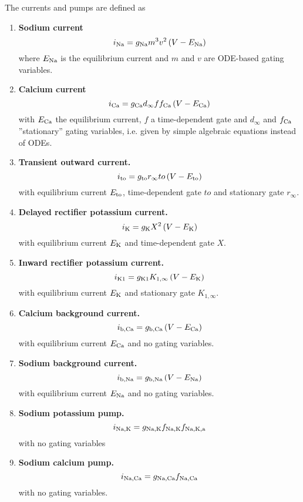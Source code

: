 \documentclass{scrartcl}
\begin{document}
The currents and pumps are defined as
\begin{enumerate}
\item {\bf Sodium current}
\begin{equation}
	i_{\rm Na} = g_{\rm Na} m^3 v^2 \left( V - E_{\rm Na} \right)
\end{equation}
where $E_{\rm Na}$ is the equilibrium current and $m$ and $v$ are ODE-based gating variables.
\item {\bf Calcium current}
\begin{equation}
	i_{\rm Ca} = g_{\rm Ca} d_{\infty} f f_{\rm Ca} \left( V - E_{\rm Ca} \right)
\end{equation}
with $E_{\rm Ca}$ the equilibrium current, $f$ a time-dependent gate and  $d_{\infty}$ and $f_{\rm Ca}$ ''stationary'' gating variables, i.e. given by simple algebraic equations instead of ODEs.
\item {\bf Transient outward current.}
\begin{equation}
	i_{\rm to} = g_{\rm to} r_{\infty} to \left( V - E_{\rm to} \right)
\end{equation}
with equilibrium current $E_{\rm to}$, time-dependent gate $to$ and stationary gate $r_{\infty}$.
\item {\bf Delayed rectifier potassium current.}
\begin{equation}
	i_{\rm K} = g_{\rm K} X^2 \left( V - E_{\rm K} \right)
\end{equation}
with equilibrium current $E_{\rm K}$ and time-dependent gate $X$.
\item {\bf Inward rectifier potassium current.}
\begin{equation}
	i_{\rm K1} = g_{\rm K1} K_{1, \infty} \left( V - E_{\rm K} \right)
\end{equation}
with equilibrium current $E_{\rm K}$ and stationary gate $K_{1, \infty}$.
\item {\bf Calcium background current.}
\begin{equation}
	i_{\rm b, Ca} = g_{\rm b, Ca} \left( V - E_{\rm Ca} \right)
\end{equation}
with equilibrium current $E_{\rm Ca}$ and no gating variables.
\item {\bf Sodium background current.}
\begin{equation}
	i_{\rm b, Na} = g_{\rm b, Na} \left( V - E_{\rm Na} \right)
\end{equation}
with equilibrium current $E_{\rm Na}$ and no gating variables.
\item {\bf Sodium potassium pump.}
\begin{equation}
	i_{\rm Na, K} = g_{\rm Na, K} f_{\rm Na, K} f_{\rm Na, K, a}
\end{equation}
with no gating variables
\item {\bf Sodium calcium pump.}
\begin{equation}
	i_{\rm Na, Ca} = g_{\rm Na, Ca} f_{\rm Na, Ca}
\end{equation}
with no gating variables.
\end{enumerate}
%
%
\end{document}
